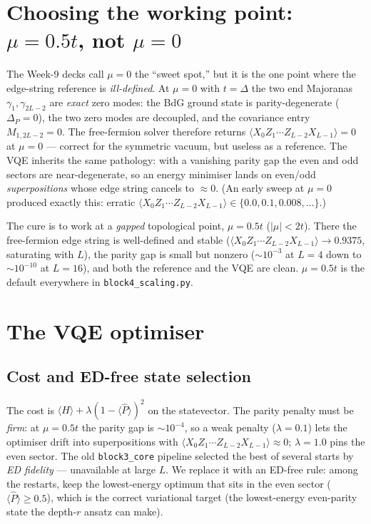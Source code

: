 \documentclass[11pt]{article}
\newcommand{\Pop}{\hat{P}}
\newcommand{\Oedge}{X_0 Z_1\cdots Z_{L-2} X_{L-1}}
\newcommand{\expv}[1]{\langle #1\rangle}
\newcommand{\code}[1]{\texttt{#1}}
\begin{document}
\section{Choosing the working point: \texorpdfstring{$\mu=0.5t$}{mu=0.5t}, not
\texorpdfstring{$\mu=0$}{mu=0}}\label{sec:mu}
The Week-9 decks call $\mu=0$ the ``sweet spot,'' but it is the one point where
the edge-string reference is \emph{ill-defined}. At $\mu=0$ with $t=\Delta$ the
two end Majoranas $\gamma_1,\gamma_{2L-2}$ are \emph{exact} zero modes: the BdG
ground state is parity-degenerate ($\Delta_P=0$), the two zero modes are
decoupled, and the covariance entry $M_{1,2L-2}=0$. The free-fermion solver
therefore returns $\expv{\Oedge}=0$ at $\mu=0$ --- correct for the symmetric
vacuum, but useless as a reference. The VQE inherits the same pathology: with a
vanishing parity gap the even and odd sectors are near-degenerate, so an energy
minimiser lands on even/odd \emph{superpositions} whose edge string cancels to
$\approx0$. (An early sweep at $\mu=0$ produced exactly this: erratic
$\expv{\Oedge}\in\{0.0,0.1,0.008,\ldots\}$.)

The cure is to work at a \emph{gapped} topological point, $\mu=0.5t$ ($|\mu|<2t$).
There the free-fermion edge string is well-defined and stable
($\expv{\Oedge}\to0.9375$, saturating with $L$), the parity gap is small but
nonzero ($\sim10^{-3}$ at $L=4$ down to $\sim10^{-10}$ at $L=16$), and both the
reference and the VQE are clean. $\mu=0.5t$ is the default everywhere in
\code{block4\_scaling.py}.

\section{The VQE optimiser}\label{sec:opt}
\subsection{Cost and ED-free state selection}
The cost is $\expv{H}+\lambda(1-\expv{\Pop})^2$ on the statevector. The parity
penalty must be \emph{firm}: at $\mu=0.5t$ the parity gap is $\sim10^{-4}$, so a
weak penalty ($\lambda=0.1$) lets the optimiser drift into superpositions with
$\expv{\Oedge}\approx0$; $\lambda=1.0$ pins the even sector. The old
\code{block3\_core} pipeline selected the best of several starts by \emph{ED
fidelity} --- unavailable at large $L$. We replace it with an ED-free rule:
among the restarts, keep the lowest-energy optimum that sits in the even sector
($\expv{\Pop}\ge0.5$), which is the correct variational target (the
lowest-energy even-parity state the depth-$r$ ansatz can make).
\end{document}
